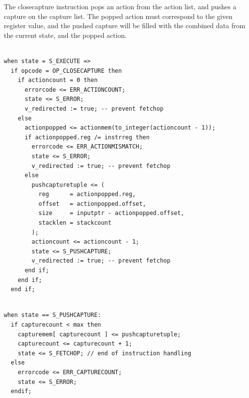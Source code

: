 The closecapture instruction pops an action from the action list,
and pushes a capture on the capture list.
The popped action must correspond to the given register value,
and the pushed capture will be filled with the combined data from the
current state, and the popped action.

\begin{myquote}
\begin{verbatim}

when state = S_EXECUTE =>
  if opcode = OP_CLOSECAPTURE then
    if actioncount = 0 then
      errorcode <= ERR_ACTIONCOUNT;
      state <= S_ERROR;
      v_redirected := true; -- prevent fetchop
    else
      actionpopped <= actionmem(to_integer(actioncount - 1));
      if actionpopped.reg /= instrreg then
        errorcode <= ERR_ACTIONMISMATCH;
        state <= S_ERROR;
        v_redirected := true; -- prevent fetchop
      else
        pushcapturetuple <= (
          reg      = actionpopped.reg,
          offset   = actionpopped.offset,
          size     = inputptr - actionpopped.offset,
          stacklen = stackcount
        );
        actioncount <= actioncount - 1;
        state <= S_PUSHCAPTURE;
        v_redirected := true; -- prevent fetchop
      end if;
    end if;
  end if;

\end{verbatim}
\end{myquote}

\begin{myquote}
\begin{verbatim}

when state == S_PUSHCAPTURE:
  if capturecount < max then
    capturemem[ capturecount ] <= pushcapturetuple;
    capturecount <= capturecount + 1;
    state <= S_FETCHOP; // end of instruction handling
  else
    errorcode <= ERR_CAPTURECOUNT;
    state <= S_ERROR;
  endif;

\end{verbatim}
\end{myquote}

